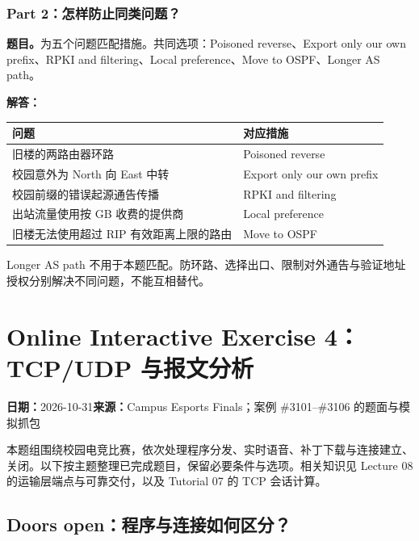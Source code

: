 \documentclass[11pt,a4paper,fontset=fandol]{ctexart}
\renewcommand{\exercisequestion}[2]{%
  \Needspace{5\baselineskip}%
  \subsubsection{#2}\label{exercise:#1}%
}
\renewcommand{\exercisemeta}[5]{%
  {\small\textbf{日期：}#2\quad\textbf{来源：}#3\par}%
}
\renewenvironment{checkedsolution}
  {\par\nopagebreak[4]\textbf{解答：}\ignorespaces}
  {\par}
\begin{document}
\exercisequestion{SC2008-HW03-Q23}{Part 2：怎样防止同类问题？}
\textbf{题目。}为五个问题匹配措施。共同选项：Poisoned reverse、Export only our own prefix、RPKI and filtering、Local preference、Move to OSPF、Longer AS path。
\begin{checkedsolution}
\begin{center}
\small
\begin{tabularx}{\textwidth}{@{}Xl@{}}
\toprule
问题 & 对应措施 \\
\midrule
旧楼的两路由器环路 & Poisoned reverse \\
校园意外为 North 向 East 中转 & Export only our own prefix \\
校园前缀的错误起源通告传播 & RPKI and filtering \\
出站流量使用按 GB 收费的提供商 & Local preference \\
旧楼无法使用超过 RIP 有效距离上限的路由 & Move to OSPF \\
\bottomrule
\end{tabularx}
\end{center}
Longer AS path 不用于本题匹配。防环路、选择出口、限制对外通告与验证地址授权分别解决不同问题，不能互相替代。
\end{checkedsolution}

\section{Online Interactive Exercise 4：TCP/UDP 与报文分析}
\label{homework:SC2008-HW04}
\exercisemeta
  {SC2008-HW04}
  {2026-10-31}
  {Campus Esports Finals；案例 \#3101--\#3106 的题面与模拟抓包}
  {已完成；按首部字段、字节范围与双向序号核对}
  {已确认完成}

本题组围绕校园电竞比赛，依次处理程序分发、实时语音、补丁下载与连接建立、关闭。以下按主题整理已完成题目，保留必要条件与选项。相关知识见 Lecture 08 的运输层端点与可靠交付，以及 Tutorial 07 的 TCP 会话计算。

\subsection{Doors open：程序与连接如何区分？}
\end{document}

